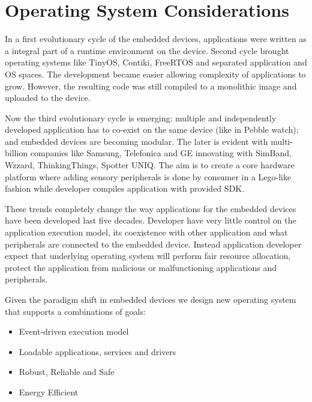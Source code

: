 \section{Operating System Considerations}
\label{os-considerations}

In a first evolutionary cycle of the embedded devices, applications were written
as a integral part of a runtime environment on the device. Second
cycle brought operating systems like TinyOS, Contiki, FreeRTOS and
separated application and OS spaces. The development became easier allowing
complexity of applications to grow. However, the resulting
code was still compiled to a monolithic image and uploaded to the device.

Now the third evolutionary cycle is emerging: multiple and independently
developed application has to co-exist on the same device (like in Pebble watch);
and embedded devices are becoming modular. The later is evident with
multi-billion companies like Samsung, Telefonica and GE innovating with SimBand, Wzzard, ThinkingThings, Spotter UNIQ.
The aim is to create a core hardware platform where adding sensory
peripherals is done by consumer in a Lego-like fashion while developer compiles
application with provided SDK.

These trends completely change the way applications for the embedded devices
have been developed last five decades. Developer have very little control on the
application execution model, its coexistence with other application and what
peripherals are connected to the embedded device. Instead application developer
expect that underlying operating system will perform fair resource allocation,
protect the application from malicious or malfunctioning applications and
peripherals. 

Given the paradigm shift in embedded devices we design new operating system
\name that supports a combinations of goals:


\begin{itemize}
  \item Event-driven execution model
  \item Loadable applications, services and drivers
  \item Robust, Reliable and Safe %
  \item Energy Efficient 
\end{itemize}



